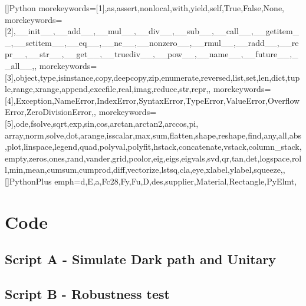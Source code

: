 \documentclass[a4paper, 12pt]{article}
\begin{document}
[]{Python}{
  morekeywords=[1]{,as,assert,nonlocal,with,yield,self,True,False,None,} %
  morekeywords=[2]{,__init__,__add__,__mul__,__div__,__sub__,__call__,__getitem__,__setitem__,__eq__,__ne__,__nonzero__,__rmul__,__radd__,__repr__,__str__,__get__,__truediv__,__pow__,__name__,__future__,__all__,}, %
  morekeywords=[3]{,object,type,isinstance,copy,deepcopy,zip,enumerate,reversed,list,set,len,dict,tuple,range,xrange,append,execfile,real,imag,reduce,str,repr,}, %
  morekeywords=[4]{,Exception,NameError,IndexError,SyntaxError,TypeError,ValueError,OverflowError,ZeroDivisionError,}, %
  morekeywords=[5]{,ode,fsolve,sqrt,exp,sin,cos,arctan,arctan2,arccos,pi, array,norm,solve,dot,arange,isscalar,max,sum,flatten,shape,reshape,find,any,all,abs,plot,linspace,legend,quad,polyval,polyfit,hstack,concatenate,vstack,column_stack,empty,zeros,ones,rand,vander,grid,pcolor,eig,eigs,eigvals,svd,qr,tan,det,logspace,roll,min,mean,cumsum,cumprod,diff,vectorize,lstsq,cla,eye,xlabel,ylabel,squeeze,}, %
}
[]{PythonPlus}{
  emph={d,E,a,Fc28,Fy,Fu,D,des,supplier,Material,Rectangle,PyElmt},
}


\section{Code}
\subsection{Script A - Simulate Dark path and Unitary}
\footnotesize


\subsection{Script B - Robustness test}
\footnotesize

\end{document}
